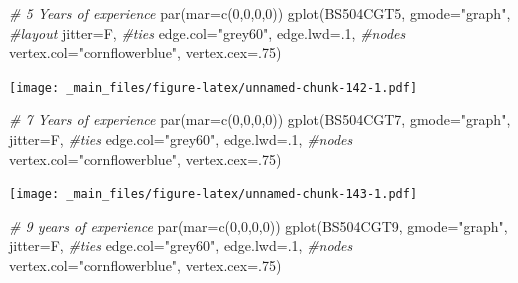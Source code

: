 \documentclass[
  notitlepage,
  onecolumn,
  openany]{book}
\newenvironment{Shaded}{\begin{snugshade}}{\end{snugshade}}
\newcommand{\AttributeTok}[1]{\textcolor[rgb]{0.77,0.63,0.00}{#1}}
\newcommand{\CommentTok}[1]{\textcolor[rgb]{0.56,0.35,0.01}{\textit{#1}}}
\newcommand{\DecValTok}[1]{\textcolor[rgb]{0.00,0.00,0.81}{#1}}
\newcommand{\FunctionTok}[1]{\textcolor[rgb]{0.00,0.00,0.00}{#1}}
\newcommand{\NormalTok}[1]{#1}
\newcommand{\StringTok}[1]{\textcolor[rgb]{0.31,0.60,0.02}{#1}}
\begin{document}
\begin{Shaded}
\begin{Highlighting}[]
\CommentTok{\# 5 Years of experience}
\FunctionTok{par}\NormalTok{(}\AttributeTok{mar=}\FunctionTok{c}\NormalTok{(}\DecValTok{0}\NormalTok{,}\DecValTok{0}\NormalTok{,}\DecValTok{0}\NormalTok{,}\DecValTok{0}\NormalTok{))}
\FunctionTok{gplot}\NormalTok{(BS504CGT5,}
      \AttributeTok{gmode=}\StringTok{"graph"}\NormalTok{,}
      \CommentTok{\#layout}
      \AttributeTok{jitter=}\NormalTok{F,}
      \CommentTok{\#ties}
      \AttributeTok{edge.col=}\StringTok{"grey60"}\NormalTok{, }
      \AttributeTok{edge.lwd=}\NormalTok{.}\DecValTok{1}\NormalTok{,}
      \CommentTok{\#nodes}
      \AttributeTok{vertex.col=}\StringTok{"cornflowerblue"}\NormalTok{,}
      \AttributeTok{vertex.cex=}\NormalTok{.}\DecValTok{75}\NormalTok{)}
\end{Highlighting}
\end{Shaded}

\texttt{[image: \_main\_files/figure-latex/unnamed-chunk-142-1.pdf]}

\begin{Shaded}
\begin{Highlighting}[]
\CommentTok{\# 7 Years of experience}
\FunctionTok{par}\NormalTok{(}\AttributeTok{mar=}\FunctionTok{c}\NormalTok{(}\DecValTok{0}\NormalTok{,}\DecValTok{0}\NormalTok{,}\DecValTok{0}\NormalTok{,}\DecValTok{0}\NormalTok{))}
\FunctionTok{gplot}\NormalTok{(BS504CGT7,}
      \AttributeTok{gmode=}\StringTok{"graph"}\NormalTok{,}
      \AttributeTok{jitter=}\NormalTok{F,}
      \CommentTok{\#ties}
      \AttributeTok{edge.col=}\StringTok{"grey60"}\NormalTok{, }
      \AttributeTok{edge.lwd=}\NormalTok{.}\DecValTok{1}\NormalTok{,}
      \CommentTok{\#nodes}
      \AttributeTok{vertex.col=}\StringTok{"cornflowerblue"}\NormalTok{,}
      \AttributeTok{vertex.cex=}\NormalTok{.}\DecValTok{75}\NormalTok{)}
\end{Highlighting}
\end{Shaded}

\texttt{[image: \_main\_files/figure-latex/unnamed-chunk-143-1.pdf]}

\begin{Shaded}
\begin{Highlighting}[]
\CommentTok{\# 9 years of experience}
\FunctionTok{par}\NormalTok{(}\AttributeTok{mar=}\FunctionTok{c}\NormalTok{(}\DecValTok{0}\NormalTok{,}\DecValTok{0}\NormalTok{,}\DecValTok{0}\NormalTok{,}\DecValTok{0}\NormalTok{))}
\FunctionTok{gplot}\NormalTok{(BS504CGT9,}
      \AttributeTok{gmode=}\StringTok{"graph"}\NormalTok{,}
      \AttributeTok{jitter=}\NormalTok{F,}
      \CommentTok{\#ties}
      \AttributeTok{edge.col=}\StringTok{"grey60"}\NormalTok{, }
      \AttributeTok{edge.lwd=}\NormalTok{.}\DecValTok{1}\NormalTok{,}
      \CommentTok{\#nodes}
      \AttributeTok{vertex.col=}\StringTok{"cornflowerblue"}\NormalTok{,}
      \AttributeTok{vertex.cex=}\NormalTok{.}\DecValTok{75}\NormalTok{)}
\end{Highlighting}
\end{Shaded}
\end{document}
